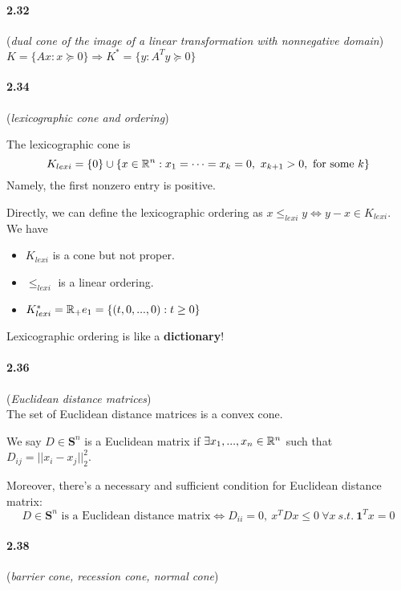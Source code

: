 \documentclass[11pt]{article}
\begin{document}
\paragraph{2.32}({\it dual cone of the image of a linear transformation with nonnegative domain})\\
\goal $K = \{Ax: x\succeq0\} \Rightarrow K^*=\{y:A^Ty\succeq0 \}$

\paragraph{2.34}({\it lexicographic cone and ordering})\\
\begin{definition}
	The lexicographic cone is
	$$K_{lexi} = \{0\}\cup\{x\in{\mathbb R}^n: x_1=\cdots=x_k=0,\ x_{k+1}>0,\ \mbox{for some } k \}$$
	Namely, the first nonzero entry is positive.
\end{definition}
Directly, we can define the lexicographic ordering as $x\leq_{lexi}y\Leftrightarrow y-x\in K_{lexi}$.\\
We have
\begin{itemize}
	\item $K_{lexi}$ is a cone but not proper.
	\item $\leq_{lexi}$ is a linear ordering.
	\item $K^*_{lexi} = {\mathbb R}_+e_1 = \{(t,0,...,0):t\geq0\}$
\end{itemize}
\begin{intuition}
	Lexicographic ordering is like a {\bf dictionary}!
\end{intuition}

\paragraph{2.36}({\it Euclidean distance matrices})\\
\goal The set of Euclidean distance matrices is a convex cone.
\begin{definition}
	We say $D\in\mathbf{S}^n$ is a Euclidean matrix if $\exists x_1,...,x_n\in{\mathbb R}^n$ such that $D_{ij} = ||x_i-x_j||^2_2$.
\end{definition}
Moreover, there's a necessary and sufficient condition for Euclidean distance matrix:
$$D\in\mathbf{S}^n\mbox{ is a Euclidean distance matrix}\Leftrightarrow D_{ii} = 0,\ x^TDx\leq0\ \forall x\ s.t.\ \mathbf{1}^Tx=0$$
\paragraph{2.38}({\it barrier cone, recession cone, normal cone})
\end{document}
